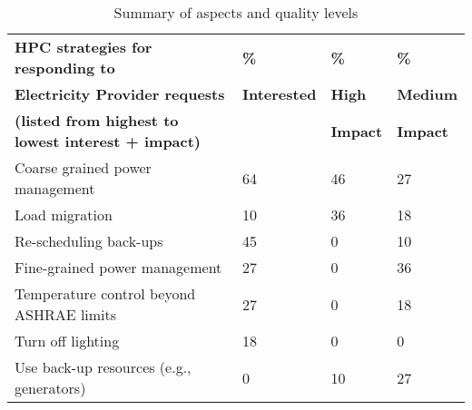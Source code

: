 \begin{table}[htbp]
\begin{center}
\caption{Summary of aspects and quality levels}
\begin{tabular}{|p{2.5in}|p{0.75in}|p{0.75in}|p{0.75in}|} \hline

\textbf{HPC strategies for responding to} &
\textbf{\%} &
\textbf{\%} &
\textbf{\%} \\

\textbf{Electricity Provider requests} &
\textbf{Interested} &
\textbf{High} &
\textbf{Medium} \\

\textbf{(listed from highest to lowest interest + impact)} &
 &
\textbf{Impact} & 
\textbf{Impact} \\
\hline

Coarse grained power management &
64 &
46 &
27 \\

Load migration &
10 &
36 &
18 \\
\hline

Re-scheduling back-ups &
45 &
0 &
10 \\
\hline

Fine-grained power management &
27 &
0 &
36 \\
\hline

Temperature control beyond ASHRAE limits &
27 &
0 &
18 \\
\hline

Turn off lighting &
18 &
0 &
0 \\
\hline

Use back-up resources (e.g., generators) &
0 &
10 &
27 \\
\hline

\end{tabular}
\label{tab3}
\end{center}

\end{table}


%

